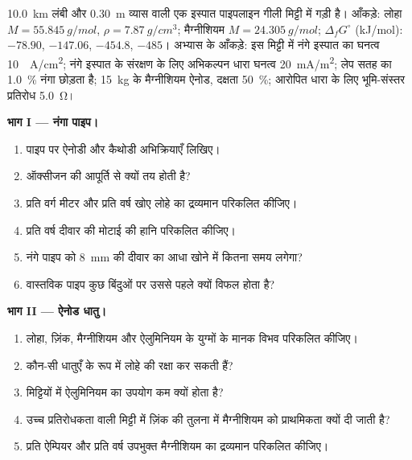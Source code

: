 \begin{problem}
\label{pb:b2:corrosion:1}
\qty{10.0}{km} लंबी और \qty{0.30}{m} व्यास वाली एक इस्पात पाइपलाइन गीली मिट्टी में
गड़ी है। आँकड़े: लोहा $M = \qty{55.845}{g/mol}$, $\rho = \qty{7.87}{g/cm^3}$;
मैग्नीशियम $M = \qty{24.305}{g/mol}$; $\Delta_f G^\circ$ (\unit{kJ/mol}): 
$-78.90$,  $-147.06$,  $-454.8$,  $-485$। अभ्यास के
आँकड़े: इस मिट्टी में नंगे इस्पात का  घनत्व \qty{10}{\micro
A/cm^2}; नंगे इस्पात के संरक्षण के लिए अभिकल्पन धारा घनत्व
\qty{20}{mA/m^2}; लेप सतह का 1.0~\% नंगा छोड़ता है; \qty{15}{kg} के
मैग्नीशियम ऐनोड, दक्षता 50~\%; आरोपित धारा के लिए भूमि-संस्तर प्रतिरोध
\qty{5.0}{\ohm}।

\medskip
\noindent\textbf{भाग I --- नंगा पाइप।}
\begin{enumerate}
  \item पाइप पर ऐनोडी और कैथोडी अभिक्रियाएँ लिखिए।
  \item {} ऑक्सीजन की आपूर्ति से क्यों तय होती है?
  \item प्रति वर्ग मीटर और प्रति वर्ष खोए लोहे का द्रव्यमान परिकलित कीजिए।
  \item प्रति वर्ष दीवार की मोटाई की हानि परिकलित कीजिए।
  \item नंगे पाइप को \qty{8}{mm} की दीवार का आधा खोने में कितना समय लगेगा?
  \item वास्तविक पाइप कुछ बिंदुओं पर उससे पहले क्यों विफल होता है?
\end{enumerate}

\medskip
\noindent\textbf{भाग II --- ऐनोड धातु।}
\begin{enumerate}[resume]
  \item लोहा, ज़िंक, मैग्नीशियम
        और ऐलुमिनियम के युग्मों के मानक विभव परिकलित कीजिए।
  \item कौन-सी धातुएँ  के रूप में लोहे की रक्षा कर सकती हैं?
  \item मिट्टियों में ऐलुमिनियम का उपयोग कम क्यों होता है?
  \item उच्च प्रतिरोधकता वाली मिट्टी में ज़िंक की तुलना में मैग्नीशियम को प्राथमिकता क्यों दी जाती है?
  \item प्रति ऐम्पियर और प्रति वर्ष उपभुक्त मैग्नीशियम का द्रव्यमान परिकलित कीजिए।
\end{enumerate}


\end{problem}
